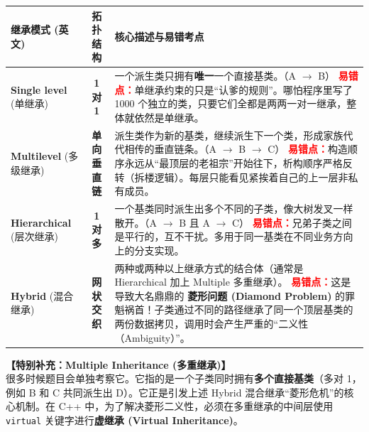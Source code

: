 \documentclass[11pt, a4paper]{article}
\begin{document}
\begin{table}[h]
    \centering
    \renewcommand{\arraystretch}{1.6} %
    \begin{tabular}{@{} l c p{9cm} @{}}
        \toprule
        \textbf{继承模式 (英文)} & \textbf{拓扑结构} & \textbf{核心描述与易错考点} \\
        \midrule
        
        \textbf{Single level} (单继承) & \textbf{1 对 1} & 
        一个派生类只拥有\textbf{唯一}一个直接基类。（A $\rightarrow$ B） \newline 
        \textcolor{red}{\textbf{易错点：}}单继承约束的只是“认爹的规则”。哪怕程序里写了 1000 个独立的类，只要它们全都是两两一对一继承，整体就依然是单继承。 \\
        
        \textbf{Multilevel} (多级继承) & \textbf{单向垂直链} & 
        派生类作为新的基类，继续派生下一个类，形成家族代代相传的垂直链条。（A $\rightarrow$ B $\rightarrow$ C）\newline 
        \textcolor{red}{\textbf{易错点：}}构造顺序永远从“最顶层的老祖宗”开始往下，析构顺序严格反转（拆楼逻辑）。每层只能看见紧挨着自己的上一层非私有成员。 \\
        
        \textbf{Hierarchical} (层次继承) & \textbf{1 对 多} & 
        一个基类同时派生出多个不同的子类，像大树发叉一样散开。（A $\rightarrow$ B 且 A $\rightarrow$ C）\newline 
        \textcolor{red}{\textbf{易错点：}}兄弟子类之间是平行的，互不干扰。多用于同一基类在不同业务方向上的分支实现。 \\
        
        \textbf{Hybrid} (混合继承) & \textbf{网状交织} & 
        两种或两种以上继承方式的结合体（通常是 Hierarchical 加上 Multiple 多重继承）。\newline 
        \textcolor{red}{\textbf{易错点：}}这是导致大名鼎鼎的 \textbf{菱形问题 (Diamond Problem)} 的罪魁祸首！子类通过不同的路径继承了同一个顶层基类的两份数据拷贝，调用时会产生严重的“二义性（Ambiguity）”。 \\
        
        \bottomrule
    \end{tabular}
\end{table}

\vspace{1em}
\noindent \textbf{【特别补充：Multiple Inheritance (多重继承)】} \\
很多时候题目会单独考察它。它指的是一个子类同时拥有\textbf{多个直接基类}（多对 1，例如 B 和 C 共同派生出 D）。它正是引发上述 Hybrid 混合继承“菱形危机”的核心机制。在 C++ 中，为了解决菱形二义性，必须在多重继承的中间层使用 \texttt{virtual} 关键字进行\textbf{虚继承 (Virtual Inheritance)}。
\end{document}
